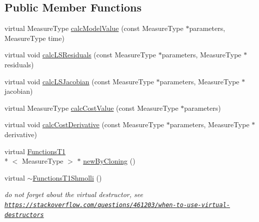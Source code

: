 \subsection*{Public Member Functions}
\begin{DoxyCompactItemize}
\item 
virtual Measure\-Type \hyperlink{class_ox_1_1_functions_t1_shmolli_a5aa7584b00d582324a4a732f40aef8c6}{calc\-Model\-Value} (const Measure\-Type $\ast$parameters, Measure\-Type time)
\item 
virtual void \hyperlink{class_ox_1_1_functions_t1_shmolli_a0c4d4be59747eb2a1ddeb523946d7c13}{calc\-L\-S\-Residuals} (const Measure\-Type $\ast$parameters, Measure\-Type $\ast$residuals)
\item 
virtual void \hyperlink{class_ox_1_1_functions_t1_shmolli_ac91be5c357ac6fd6a242738f155a047a}{calc\-L\-S\-Jacobian} (const Measure\-Type $\ast$parameters, Measure\-Type $\ast$jacobian)
\item 
virtual Measure\-Type \hyperlink{class_ox_1_1_functions_t1_shmolli_a035ab94c00c7d879695182b829497b89}{calc\-Cost\-Value} (const Measure\-Type $\ast$parameters)
\item 
virtual void \hyperlink{class_ox_1_1_functions_t1_shmolli_a4e4173c90d45965b0627b2b2c86a6c96}{calc\-Cost\-Derivative} (const Measure\-Type $\ast$parameters, Measure\-Type $\ast$derivative)
\item 
virtual \hyperlink{class_ox_1_1_functions_t1}{Functions\-T1}\\*
$<$ Measure\-Type $>$ $\ast$ \hyperlink{class_ox_1_1_functions_t1_shmolli_aea5d0c6e7f7bf42f4f1678cad8220382}{new\-By\-Cloning} ()
\item 
\hypertarget{class_ox_1_1_functions_t1_shmolli_a119cae9d4df7a7c529f615b5448a1aa4}{virtual \hyperlink{class_ox_1_1_functions_t1_shmolli_a119cae9d4df7a7c529f615b5448a1aa4}{$\sim$\-Functions\-T1\-Shmolli} ()}\label{class_ox_1_1_functions_t1_shmolli_a119cae9d4df7a7c529f615b5448a1aa4}

\begin{DoxyCompactList}\small\item\em do not forget about the virtual destructor, see \href{https://stackoverflow.com/questions/461203/when-to-use-virtual-destructors}{\tt https\-://stackoverflow.\-com/questions/461203/when-\/to-\/use-\/virtual-\/destructors} \end{DoxyCompactList}\end{DoxyCompactItemize}
